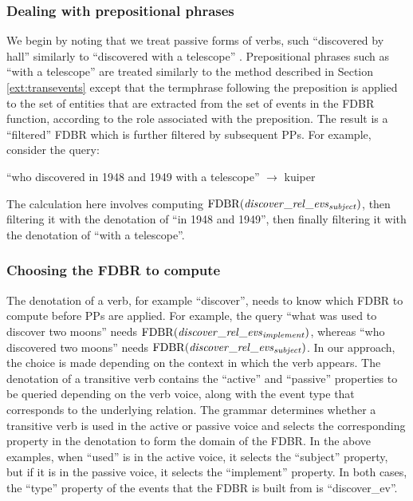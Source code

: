 \documentclass[../main.tex]{subfiles}
\begin{document}
\begin{refsection}
\subsubsection{Dealing with prepositional phrases}

We begin by noting that we treat passive forms of verbs, such ``discovered by hall'' similarly to
``discovered with a telescope'' \cite{peelar2016accommodating}. Prepositional phrases such as ``with a telescope'' are treated similarly to the method described in Section \ref{ext:transevents} except that
the termphrase following the preposition is applied to the set of entities that are extracted
from the set of events in the FDBR function, according to the role associated with the preposition. The
result is a ``filtered'' FDBR which is further filtered by subsequent PPs. For
example, consider the query:

``who discovered in 1948 and 1949 with a telescope'' $\rightarrow$ kuiper

The calculation here involves computing $\mathrm{FDBR}({\mathit{discover\_rel}\_\mathit{evs}_{\mathit{subject}}})$, then filtering it with the denotation of ``in 1948 and 1949'', then finally filtering it with the denotation of ``with a telescope''. %

\subsubsection{Choosing the FDBR to compute}
\label{ext:choosingfdbr}

The denotation of a verb, for example ``discover'', needs to know which FDBR to compute
before PPs are applied. For example, the query ``what was used to discover
two moons'' needs $\mathrm{FDBR}({\mathit{discover\_rel}\_\mathit{evs}_\mathit{implement}})$, whereas ``who discovered two moons'' needs
$\mathrm{FDBR}({\mathit{discover\_rel}\_\mathit{evs}_\mathit{subject}})$. In our approach, the choice is made depending on the context in
which the verb appears. The denotation of a transitive verb contains the ``active'' and ``passive'' properties to be queried depending
on the verb voice, along with the event type that corresponds to the underlying relation. The grammar determines whether a transitive verb is used in the active or passive voice and selects the corresponding property in the denotation to form the domain of the FDBR. In the above examples, when ``used'' is in the active voice, it selects the ``subject'' property, but if it is in the passive voice, it selects the ``implement'' property. In both cases, the ``type'' property of the events that the FDBR is built from is ``discover\_ev''.


\end{refsection}
\end{document}
